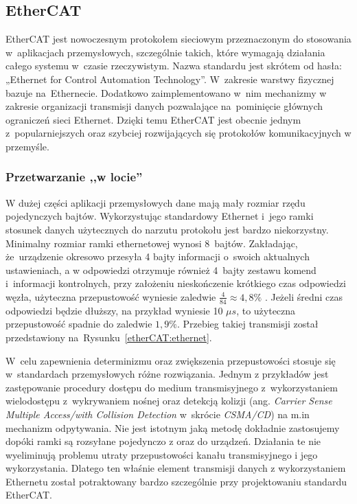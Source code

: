 \vspace{-2mm}
\subsection{EtherCAT}

EtherCAT jest nowoczesnym protokołem sieciowym przeznaczonym do stosowania w~aplikacjach przemysłowych, szczególnie takich, które wymagają działania całego systemu w~czasie rzeczywistym. Nazwa standardu jest skrótem od hasła: „Ethernet for Control Automation Technology”. W~zakresie warstwy fizycznej bazuje na~Ethernecie. Dodatkowo zaimplementowano w~nim mechanizmy w zakresie organizacji transmisji danych pozwalające na~pominięcie głównych ograniczeń sieci Ethernet. Dzięki temu EtherCAT jest obecnie jednym z~popularniejszych oraz szybciej rozwijających się protokołów komunikacyjnych w przemyśle.

\subsubsection{Przetwarzanie ,,w locie''}
W dużej części aplikacji przemysłowych dane mają mały rozmiar rzędu pojedynczych bajtów. Wykorzystując standardowy Ethernet i~jego ramki stosunek danych użytecznych do narzutu protokołu jest bardzo niekorzystny. 
Minimalny rozmiar ramki ethernetowej wynosi 8~bajtów. Zakładając, że~urządzenie okresowo przesyła 4 bajty informacji o~swoich aktualnych ustawieniach, a w odpowiedzi otrzymuje również 4~bajty zestawu komend i~informacji kontrolnych, przy założeniu nieskończenie krótkiego czas odpowiedzi węzła, użyteczna przepustowość wyniesie zaledwie $\frac{4}{84}\approx4,8\%$ \cite{kwiecien,gaj}. Jeżeli średni czas odpowiedzi będzie dłuższy, na przykład wyniesie 10 $\mu s$, to użyteczna przepustowość spadnie do zaledwie $1,9\%$. Przebieg takiej transmisji został przedstawiony na~Rysunku~\ref{etherCAT:ethernet}.

\vspace{-3mm}

W~celu zapewnienia determinizmu oraz zwiększenia przepustowości stosuje się w~standardach przemysłowych różne rozwiązania. Jednym z przykładów jest zastępowanie procedury dostępu do medium transmisyjnego z~wykorzystaniem wielodostępu z~wykrywaniem nośnej oraz detekcją kolizji (ang. \textit{Carrier Sense Multiple Access/with Collision Detection} w~skrócie \textit{CSMA/CD}) na m.in mechanizm odpytywania.
Nie jest istotnym jaką metodę dokładnie zastosujemy dopóki ramki są rozsyłane pojedynczo z oraz do urządzeń. Działania te nie wyeliminują problemu utraty przepustowości kanału transmisyjnego i jego wykorzystania. Dlatego ten właśnie element transmisji danych z wykorzystaniem Ethernetu został potraktowany bardzo szczególnie przy projektowaniu standardu EtherCAT.

